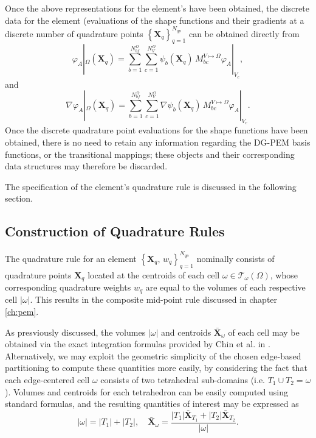 	Once the above representations for the element's have been obtained, the discrete data for the element (evaluations of the shape functions and their gradients at a discrete number of quadrature points $\left\{ \mathbf{X}_q \right\}_{q=1}^{N_{qp}}$ can be obtained directly from
	\begin{equation}
		\varphi_A |_{\Omega} (\mathbf{X}_q) = \sum_{b = 1}^{N^\Omega_{bf}} \sum_{c = 1}^{N^\Omega_{V}} \psi_b (\mathbf{X}_q) \, M^{V \mapsto \Omega}_{bc} \varphi_A |_{V_c},
	\end{equation}
	and
	\begin{equation}
		\nabla \varphi_A |_{\Omega} (\mathbf{X}_q) = \sum_{b = 1}^{N^\Omega_{bf}} \sum_{c = 1}^{N^\Omega_{V}} \nabla \psi_b (\mathbf{X}_q) \, M^{V \mapsto \Omega}_{bc} \varphi_A |_{V_c}.
	\end{equation}
	Once the discrete quadrature point evaluations for the shape functions have been obtained, there is no need to retain any information regarding the DG-PEM basis functions, or the transitional mappings; these objects and their corresponding data structures may therefore be discarded.

	The specification of the element's quadrature rule is discussed in the following section.

\subsection*{Construction of Quadrature Rules}

	The quadrature rule for an element $\left\{ \mathbf{X}_q, \, w_q \right\}_{q=1}^{N_{qp}}$ nominally consists of quadrature points $\mathbf{X}_q$ located at the centroids of each cell $\omega \in \mathcal{T}_\omega (\Omega)$, whose corresponding quadrature weights $w_q$ are equal to the volumes of each respective cell $|\omega|$. This results in the composite mid-point rule discussed in chapter \ref{ch:pem}.

	As presviously discussed, the volumes $|\omega|$ and centroids $\bar{\mathbf{X}}_\omega$ of each cell may be obtained via the exact integration formulas provided by Chin et al. in \cite{Chin:15}. Alternatively, we may exploit the geometric simplicity of the chosen edge-based partitioning to compute these quantities more easily, by considering the fact that each edge-centered cell $\omega$ consists of two tetrahedral sub-domains (i.e. $T_1 \cup T_2 = \omega$). Volumes and centroids for each tetrahedron can be easily computed using standard formulas, and the resulting quantities of interest may be expressed as
	\begin{equation}
		|\omega| = |T_1| + |T_2|, \quad \bar{\mathbf{X}}_\omega = \frac{|T_1| \bar{\mathbf{X}}_{T_1} + |T_2| \bar{\mathbf{X}}_{T_2}}{|\omega|}.
	\end{equation}

